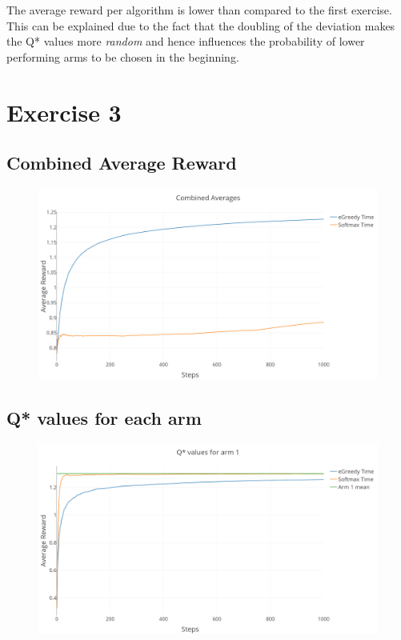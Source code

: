 \documentclass[a4paper, 11pt]{article}
\begin{document}
The average reward per algorithm is lower than compared to the first exercise. This can be explained due to the fact that the doubling of the deviation makes the Q* values more \textit{random} and hence influences the probability of lower performing arms to be chosen in the beginning.



\section{Exercise 3}
\subsection{Combined Average Reward}

\begin{figure}[H]
	\centering
    \includegraphics[width=1\linewidth]{ex1_3_average_rewards}
\end{figure}

\subsection{Q* values for each arm}

\begin{figure}[H]
	\centering
    \includegraphics[width=1\linewidth]{ex1_3_Q1}
\end{figure}
\end{document}
